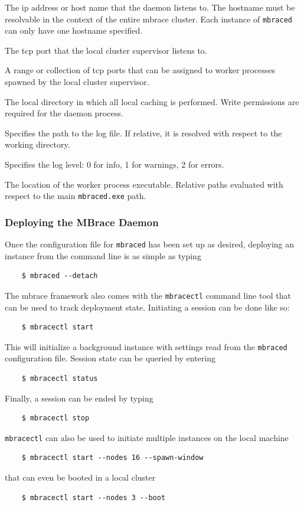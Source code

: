 \documentclass[9pt,a4paper]{article}
\newcommand{\mbrace}{mbrace}
\newcommand{\TitularMbrace}{MBrace}
\begin{document}
\begin{description}[style=unboxed, font=\sffamily]
\item[Hostname] The ip address or host name that the daemon listens to.
The hostname must be resolvable in the context of the entire \mbrace{} cluster.
Each instance of \texttt{mbraced} can only have one hostname specified.
\item[Primary Port] The tcp port that the local cluster supervisor listens to.
\item[Worker Port Range] A range or collection of tcp ports that can be assigned
to worker processes spawned by the local cluster supervisor.
\item[Working Directory] The local directory in which all local caching is performed.
Write permissions are required for the daemon process.
\item[Log File] Specifies the path to the log file. If relative, it is resolved with
respect to the working directory.
\item[Log Level] Specifies the log level: 0 for info, 1 for warnings, 2 for errors.
\item[ProcessDomain Executable] The location of the worker process executable.
Relative paths evaluated with respect to the main \texttt{mbraced.exe} path.
\end{description}

\subsubsection*{Deploying the \TitularMbrace{} Daemon}

Once the configuration file for \texttt{mbraced} has been set up as desired,
deploying an instance from the command line is as simple as typing
\begin{verbatim}
    $ mbraced --detach
\end{verbatim}
The \mbrace{} framework also comes with the \texttt{mbracectl} command line tool
that can be used to track deployment state. Initiating a session can be done like so:
\begin{verbatim}
    $ mbracectl start
\end{verbatim}
This will initialize a background instance with settings read from the \texttt{mbraced}
configuration file. Session state can be queried by entering
\begin{verbatim}
    $ mbracectl status
\end{verbatim}
Finally, a session can be ended by typing
\begin{verbatim}
    $ mbracectl stop
\end{verbatim}
\texttt{mbracectl} can also be used to initiate multiple instances on the local machine
\begin{verbatim}
    $ mbracectl start --nodes 16 --spawn-window
\end{verbatim}
that can even be booted in a local cluster
\begin{verbatim}
    $ mbracectl start --nodes 3 --boot
\end{verbatim}
\end{document}
